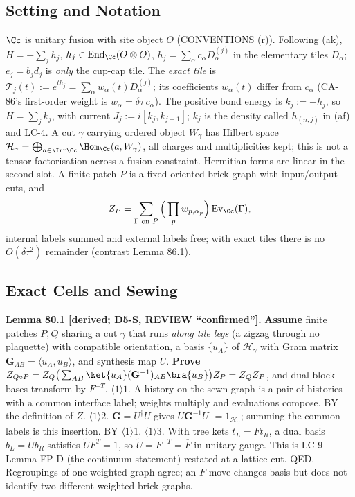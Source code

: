 \subsection{Setting and Notation}

\(\Cc\) is unitary fusion with site object \(O\) (CONVENTIONS (r)).  Following (ak), \(H=-\sum_jh_j\),
\(h_j\in\operatorname{End}_\Cc(O\otimes O)\), \(h_j=\sum_\alpha c_\alpha D^{(j)}_\alpha\) in the elementary
tiles \(D_\alpha\); \(e_j=b_jd_j\) is \emph{only} the cup-cap tile.  The \emph{exact tile} is
\(\mathcal T_j(t):=e^{th_j}=\sum_\alpha w_\alpha(t)D^{(j)}_\alpha\); its coefficients \(w_\alpha(t)\) differ
from \(c_\alpha\) (CA-86's first-order weight is \(w_\alpha=\delta\tau\,c_\alpha\)).  The positive bond
energy is \(k_j:=-h_j\), so \(H=\sum_jk_j\), with current \(J_j:=i[k_j,k_{j+1}]\); \(k_j\) is the density
called \(h_{(n,j)}\) in (af) and LC-4.  A cut \(\gamma\) carrying ordered object \(W_\gamma\) has Hilbert
space \(\mathcal H_\gamma=\bigoplus_{a\in\Irr\Cc}\Hom_\Cc(a,W_\gamma)\), all charges and multiplicities
kept; this is not a tensor factorisation across a fusion constraint.  Hermitian forms are linear in the
second slot.  A finite patch \(P\) is a fixed oriented brick graph with input/output cuts, and
\[
  Z_P=\sum_{\Gamma\text{ on }P}\Big(\prod_pw_{p,\alpha_p}\Big)\operatorname{Ev}_\Cc(\Gamma),
\]
internal labels summed and external labels free; with exact tiles there is no \(O(\delta\tau^2)\)
remainder (contrast Lemma 86.1).

\subsection{Exact Cells and Sewing}

\textbf{Lemma 80.1 [derived; D5-S, REVIEW ``confirmed''].}  \textbf{Assume} finite patches \(P,Q\) sharing a
cut \(\gamma\) that runs \emph{along tile legs} (a zigzag through no plaquette) with compatible
orientation, a basis \(\{u_A\}\) of \(\mathcal H_\gamma\) with Gram matrix \(\mathbf G_{AB}=\langle
u_A,u_B\rangle\), and synthesis map \(U\).  \textbf{Prove} \(Z_{Q\circ P}=Z_Q\big(\sum_{AB}\ket{u_A}
(\mathbf G^{-1})_{AB}\bra{u_B}\big)Z_P=Z_QZ_P\), and dual block bases transform by \(F^{-T}\).
\(\langle1\rangle1\). A history on the sewn graph is a pair of histories with a common interface label;
weights multiply and evaluations compose.  BY the definition of \(Z\).
\(\langle1\rangle2\). \(\mathbf G=U^\dagger U\) gives \(U\mathbf G^{-1}U^\dagger=1_{\mathcal H_\gamma}\); summing the
common labels is this insertion.  BY \(\langle1\rangle1\).
\(\langle1\rangle3\). With tree kets \(t_L=Ft_R\), a dual basis \(b_L=\tilde Ub_R\) satisfies \(\tilde UF^T=1\),
so \(\tilde U=F^{-T}=\overline F\) in unitary gauge.  This is LC-9 Lemma FP-D (the continuum statement)
restated at a lattice cut.  QED.
Regroupings of one weighted graph agree; an \(F\)-move changes basis but does not identify two
different weighted brick graphs.

